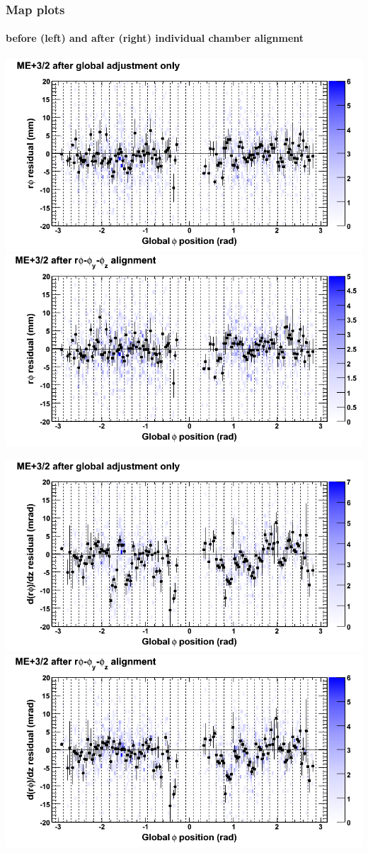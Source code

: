 \documentclass[compress]{beamer}
\begin{document}
\begin{frame}
\frametitle{Map plots}
\framesubtitle{before (left) and after (right) individual chamber alignment}
\includegraphics[width=0.5\linewidth]{ringmapplots_3dof/before_CSCvsphi_mep32_x.png} \includegraphics[width=0.5\linewidth]{ringmapplots_3dof/after_CSCvsphi_mep32_x.png}

\includegraphics[width=0.5\linewidth]{ringmapplots_3dof/before_CSCvsphi_mep32_dxdz.png} \includegraphics[width=0.5\linewidth]{ringmapplots_3dof/after_CSCvsphi_mep32_dxdz.png}
\end{frame}
\end{document}
